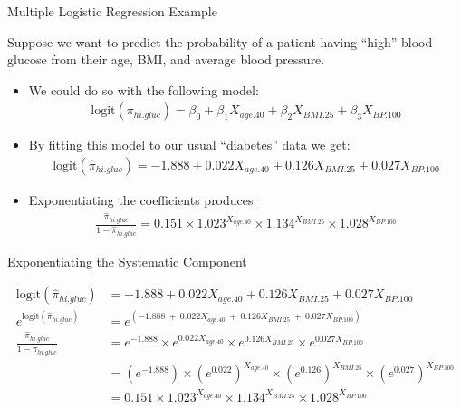 \documentclass{beamer}\usepackage[]{graphicx}\usepackage[]{color}
\begin{document}

\begin{frame}{Multiple Logistic Regression Example}
  


Suppose we want to predict the probability of a patient having ``high'' blood 
glucose from their age, BMI, and average blood pressure.
\vc
\begin{itemize}
\item We could do so with the following model:
  \begin{align*}
    \text{logit}(\pi_{hi.gluc}) = 
    \beta_0 + \beta_1 X_{age.40} + \beta_2 X_{BMI.25} + \beta_3 X_{BP.100}
  \end{align*}
\item By fitting this model to our usual ``diabetes'' data we get:
  \begin{align*}
    \text{logit}(\hat{\pi}_{hi.gluc}) = 
    -1.888 + 0.022 X_{age.40} + 0.126 X_{BMI.25} + 0.027 X_{BP.100}
  \end{align*}
\item Exponentiating the coefficients produces:
  \begin{align*}
    \frac{\hat{\pi}_{hi.gluc}}{1 - \hat{\pi}_{hi.gluc}} = 
    0.151 \times 1.023^{X_{age.40}} \times 1.134^{X_{BMI.25}} \times 
    1.028^{X_{BP.100}}
  \end{align*}
\end{itemize}

\end{frame}

  
\begin{frame}{Exponentiating the Systematic Component}
  
  \begin{align*}
    \text{logit}(\hat{\pi}_{hi.gluc}) &= -1.888 + 0.022 X_{age.40} + 
    0.126 X_{BMI.25} + 0.027 X_{BP.100}\\[12pt]
    e^{\text{logit}(\hat{\pi}_{hi.gluc})} &= 
    e^{\left(-1.888 ~ + ~ 0.022 X_{age.40} ~ + ~ 0.126 X_{BMI.25} 
      ~ + ~ 0.027 X_{BP.100} \right)}\\[8pt]
    \frac{\hat{\pi}_{hi.gluc}}{1 - \hat{\pi}_{hi.gluc}} &= 
    e^{-1.888} \times e^{0.022 X_{age.40}} \times e^{0.126 X_{BMI.25}} \times 
    e^{0.027 X_{BP.100}}\\[8pt]
    &= \left(e^{-1.888}\right) \times \left(e^{0.022}\right)^{X_{age.40}} \times 
    \left(e^{0.126}\right)^{X_{BMI.25}} \times 
    \left(e^{0.027}\right)^{X_{BP.100}}\\[14pt]
    &= 0.151 \times 1.023^{X_{age.40}} \times 1.134^{X_{BMI.25}} 
    \times 1.028^{X_{BP.100}}
  \end{align*}

\end{frame}
\end{document}
